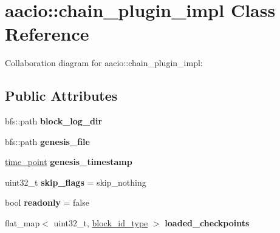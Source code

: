 \hypertarget{classaacio_1_1chain__plugin__impl}{}\section{aacio\+:\+:chain\+\_\+plugin\+\_\+impl Class Reference}
\label{classaacio_1_1chain__plugin__impl}


Collaboration diagram for aacio\+:\+:chain\+\_\+plugin\+\_\+impl\+:
\subsection*{Public Attributes}
\begin{DoxyCompactItemize}
\item 
\mbox{\label{classaacio_1_1chain__plugin__impl_a60d7d46209ff4f608b2146a8422016b6}} 
bfs\+::path {\bfseries block\+\_\+log\+\_\+dir}
\item 
\mbox{\label{classaacio_1_1chain__plugin__impl_a8fa43d8d86f00085e408de0fe07e5b92}} 
bfs\+::path {\bfseries genesis\+\_\+file}
\item 
\mbox{\label{classaacio_1_1chain__plugin__impl_a4b976a3f68f869b60fce93021a8538a4}} 
\mbox{\hyperlink{classfc_1_1time__point}{time\+\_\+point}} {\bfseries genesis\+\_\+timestamp}
\item 
\mbox{\label{classaacio_1_1chain__plugin__impl_a9dfc44ebb3e8659038b3a3921935c398}} 
uint32\+\_\+t {\bfseries skip\+\_\+flags} = skip\+\_\+nothing
\item 
\mbox{\label{classaacio_1_1chain__plugin__impl_a2856441213a5ed65606a5f0f5a4005d9}} 
bool {\bfseries readonly} = false
\item 
\mbox{\label{classaacio_1_1chain__plugin__impl_a867e12892ea07e33786a6270d2d16229}} 
flat\+\_\+map$<$ uint32\+\_\+t, \mbox{\hyperlink{classfc_1_1sha256}{block\+\_\+id\+\_\+type}} $>$ {\bfseries loaded\+\_\+checkpoints}
\item 
\mbox{\label{classaacio_1_1chain__plugin__impl_afeea14538c81a31608fceeb9a23615c8}} 

\end{DoxyCompactItemize}
